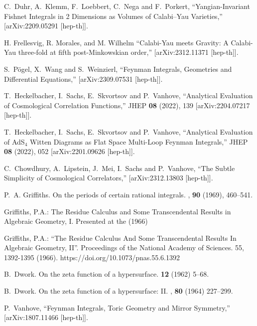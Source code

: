 \documentclass[a4paper,12pt]{article}
\numberwithin{equation}{section}
\numberwithin{figure}{section}
\begin{document}
\begin{thebibliography}{99}
C.~Duhr, A.~Klemm, F.~Loebbert, C.~Nega and F.~Porkert,
``Yangian-Invariant Fishnet Integrals in 2 Dimensions as Volumes of Calabi--Yau Varieties,''
[arXiv:2209.05291 [hep-th]].

H. Frellesvig, R. Morales, and M. Wilhelm
``Calabi-Yau meets Gravity: A Calabi-Yau three-fold at fifth post-Minkowskian order,''
[arXiv:2312.11371 [hep-th]].

S.~P\"ogel, X.~Wang and S.~Weinzierl,
``Feynman Integrals, Geometries and Differential Equations,''
[arXiv:2309.07531 [hep-th]].
  

T.~Heckelbacher, I.~Sachs, E.~Skvortsov and P.~Vanhove,
``Analytical Evaluation of Cosmological Correlation Functions,''
JHEP \textbf{08} (2022), 139
[arXiv:2204.07217 [hep-th]].

T.~Heckelbacher, I.~Sachs, E.~Skvortsov and P.~Vanhove,
``Analytical Evaluation of AdS$_{4}$ Witten Diagrams as Flat Space Multi-Loop Feynman Integrals,''
JHEP \textbf{08} (2022), 052
[arXiv:2201.09626 [hep-th]].

C.~Chowdhury, A.~Lipstein, J.~Mei, I.~Sachs and P.~Vanhove,
``The Subtle Simplicity of Cosmological Correlators,''
[arXiv:2312.13803 [hep-th]].


P.~A. Griffiths.
\newblock On the periods of certain rational integrals.
, {\bf 90} (1969), 460--541.


   Griffiths, P.A.: The Residue Calculus and Some
    Transcendental Results in Algebraic Geometry, I. Presented at the
    (1966)

    Griffiths, P.A.: ``The Residue Calculus And Some Transcendental
    Results In Algebraic Geometry, II''. Proceedings of the National
    Academy of Sciences. 55, 1392-1395
    (1966). https://doi.org/10.1073/pnas.55.6.1392 

B.~Dwork.
\newblock On the zeta function of a hypersurface.
 {\bf 12} (1962) 5--68.

B.~Dwork.
\newblock On the zeta function of a hypersurface: {{II}}.
, {\bf 80} (1964) 227--299.
  
P.~Vanhove,
``Feynman Integrals, Toric Geometry and Mirror Symmetry,''
[arXiv:1807.11466 [hep-th]].
  

\end{thebibliography}
\end{document}

